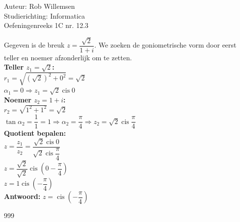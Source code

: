 \documentclass[a4paper]{article}
\begin{document}
\noindent \large Auteur: Rob Willemsen \\
\noindent \large Studierichting: Informatica\\
\noindent \large Oefeningenreeks 1C nr. 12.3\\

\medskip
\normalsize

Gegeven is de breuk $z = \dfrac{\sqrt{2}}{1+i}$. We zoeken de goniometrische vorm door eerst teller en noemer afzonderlijk om te zetten. \\

\textbf{Teller $z_1 = \sqrt{2}$:} \\

$r_1 = \sqrt{(\sqrt{2})^2 + 0^2} = \sqrt{2}$ \\

$\alpha_1 = 0 \Rightarrow z_1 = \sqrt{2} \operatorname{cis} 0$ \\

\textbf{Noemer $z_2 = 1+i$:} \\

$r_2 = \sqrt{1^2 + 1^2} = \sqrt{2}$ \\

$\tan \alpha_2 = \dfrac{1}{1} = 1 \Rightarrow \alpha_2 = \dfrac{\pi}{4} \Rightarrow z_2 = \sqrt{2} \operatorname{cis} \dfrac{\pi}{4}$ \\

\textbf{Quotient bepalen:} \\

$z = \dfrac{z_1}{z_2} = \dfrac{\sqrt{2} \operatorname{cis} 0}{\sqrt{2} \operatorname{cis} \dfrac{\pi}{4}}$ \\

$z = \dfrac{\sqrt{2}}{\sqrt{2}} \operatorname{cis} \left(0 - \dfrac{\pi}{4}\right)$ \\

$z = 1 \operatorname{cis} \left(-\dfrac{\pi}{4}\right)$ \\

\textbf{Antwoord:} $z = \operatorname{cis} \left(-\dfrac{\pi}{4}\right)$ \\

\begin{thebibliography}{999}
\end{thebibliography}
\end{document}
